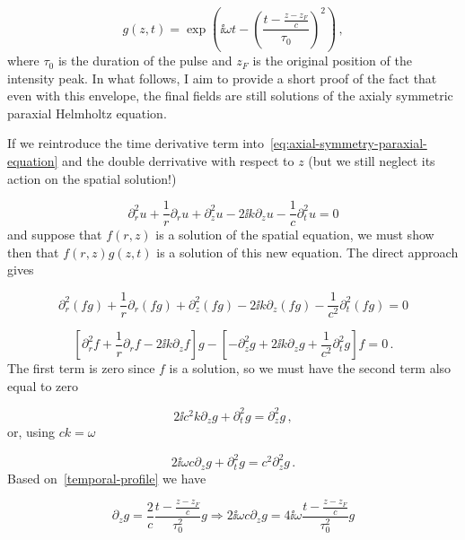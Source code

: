 \documentclass[12pt, class=report, crop=false]{standalone}
\begin{document}
\begin{equation}
  \label{temporal-profile}
  g(z,t) = \exp(\ii \omega t - \left( \frac{t-\frac{z-z_F}{c}}{\tau_0}\right)^2)\,,
\end{equation}
where \(\tau_0\) is the duration of the pulse and \(z_F\) is the original position of the intensity peak.
 In what follows, I aim to provide a short proof of the fact that even with this envelope, the final fields are still solutions of the axialy symmetric paraxial Helmholtz equation.

If we reintroduce the time derivative term into~\cref{eq:axial-symmetry-paraxial-equation} and the double derrivative with respect to \(z\) (but we still neglect its action on the spatial solution!)

\begin{equation}
  \partial_r^2 u +\frac{1}{r} \partial_r u +\partial_z^2 u - 2\ii k \partial_z u -\frac{1}{c} \partial_t^2 u = 0
\end{equation}
and suppose that \(f(r,z)\) is a solution of the spatial equation, we must show then that \(f(r,z)g(z,t)\) is a solution of this new equation.
The direct approach gives

\begin{equation*}
  \partial_r^2 (fg) +\frac{1}{r} \partial_r (fg) +\partial_z^2 (fg) - 2\ii k \partial_z (fg) -\frac{1}{c^2} \partial_t^2 (fg) = 0
\end{equation*}

\begin{equation*}
  \left[\partial_r^2 f +\frac{1}{r} \partial_r f - 2\ii k \partial_z f \right] g - \left[-\partial_z^2 g + 2\ii k \partial_z g +\frac{1}{c^2} \partial_t^2 g\right] f=0\,.
\end{equation*}
The first term is zero since \(f\) is a solution, so we must have the second term also equal to zero

\begin{equation*}
  2 \ii c^2 k \partial_z g +\partial_t^2 g= \partial_z^2 g\,,
\end{equation*}
or, using \(ck=\omega\)

\begin{equation}
  2 \ii \omega c \partial_z g +\partial_t^2 g=c^2 \partial_z^2 g\,.
\end{equation}
Based on~\cref{temporal-profile} we have

\begin{equation}
  \partial_z g = \frac{2}{c} \frac{t-\frac{z-z_F}{c}}{\tau_0^2} g \Rightarrow 2 \ii \omega c \partial_z g = 4\ii \omega \frac{t-\frac{z-z_F}{c}}{\tau_0^2} g
\end{equation}
\end{document}
